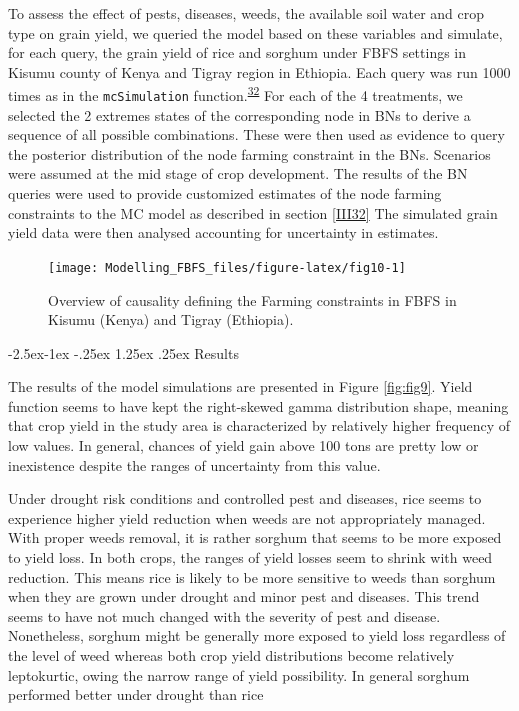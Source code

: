 \documentclass[12pt,oneside]{article}
\makeatletter
\renewcommand\paragraph{\@startsection{paragraph}{4}{\z@}%
            {-2.5ex\@plus -1ex \@minus -.25ex}%
            {1.25ex \@plus .25ex}%
            {\normalfont\normalsize\bfseries}}
\makeatother
\begin{document}
To assess the effect of pests, diseases, weeds, the available soil water and crop type on grain yield, we queried the model based on these variables and simulate, for each query, the grain yield of rice and sorghum under FBFS settings in Kisumu county of Kenya and Tigray region in Ethiopia. Each query was run 1000 times as in the \texttt{mcSimulation} function.\textsuperscript{\protect\hyperlink{ref-Luedeling_and_Goehring_2018}{32}} For each of the 4 treatments, we selected the 2 extremes states of the corresponding node in BNs to derive a sequence of all possible combinations. These were then used as evidence to query the posterior distribution of the node farming constraint in the BNs. Scenarios were assumed at the mid stage of crop development. The results of the BN queries were used to provide customized estimates of the node farming constraints to the MC model as described in section \ref{III32} The simulated grain yield data were then analysed accounting for uncertainty in estimates.

\begin{figure}[!htbp]

{\centering \texttt{[image: Modelling\_FBFS\_files/figure-latex/fig10-1]} 

}

\caption{Overview of causality defining the Farming constraints in FBFS in Kisumu (Kenya) and Tigray (Ethiopia).}\label{fig:fig10}
\end{figure}

\hypertarget{IV233}{%
\paragraph{Results}\label{IV233}}

The results of the model simulations are presented in Figure \ref{fig:fig9}. Yield function seems to have kept the right-skewed gamma distribution shape, meaning that crop yield in the study area is characterized by relatively higher frequency of low values. In general, chances of yield gain above 100 tons are pretty low or inexistence despite the ranges of uncertainty from this value.

Under drought risk conditions and controlled pest and diseases, rice seems to experience higher yield reduction when weeds are not appropriately managed. With proper weeds removal, it is rather sorghum that seems to be more exposed to yield loss. In both crops, the ranges of yield losses seem to shrink with weed reduction. This means rice is likely to be more sensitive to weeds than sorghum when they are grown under drought and minor pest and diseases. This trend seems to have not much changed with the severity of pest and disease. Nonetheless, sorghum might be generally more exposed to yield loss regardless of the level of weed whereas both crop yield distributions become relatively leptokurtic, owing the narrow range of yield possibility. In general sorghum performed better under drought than rice
\end{document}
